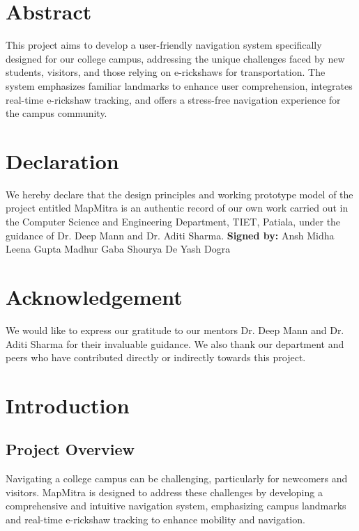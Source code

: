 \documentclass[a4paper,12pt]{report}
\begin{document}
\chapter*{Abstract}
This project aims to develop a user-friendly navigation system specifically designed for our college campus, addressing the unique challenges faced by new students, visitors, and those relying on e-rickshaws for transportation. The system emphasizes familiar landmarks to enhance user comprehension, integrates real-time e-rickshaw tracking, and offers a stress-free navigation experience for the campus community.
\newpage

\chapter*{Declaration}
We hereby declare that the design principles and working prototype model of the project entitled MapMitra is an authentic record of our own work carried out in the Computer Science and Engineering Department, TIET, Patiala, under the guidance of Dr. Deep Mann and Dr. Aditi Sharma.
\newline
\newline
\textbf{Signed by:}  Ansh Midha  Leena Gupta  Madhur Gaba  Shourya De  Yash Dogra \newline
\newpage

\tableofcontents
\newpage



\chapter*{Acknowledgement}
We would like to express our gratitude to our mentors Dr. Deep Mann and Dr. Aditi Sharma for their invaluable guidance. We also thank our department and peers who have contributed directly or indirectly towards this project.
\newpage

\chapter{Introduction}
\section{Project Overview}
Navigating a college campus can be challenging, particularly for newcomers and visitors. MapMitra is designed to address these challenges by developing a comprehensive and intuitive navigation system, emphasizing campus landmarks and real-time e-rickshaw tracking to enhance mobility and navigation.
\newpage
\end{document}
